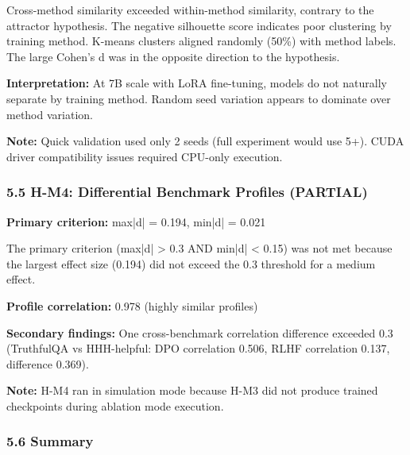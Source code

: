 Cross-method similarity exceeded within-method similarity, contrary to the attractor hypothesis. The negative silhouette score indicates poor clustering by training method. K-means clusters aligned randomly (50\%) with method labels. The large Cohen's d was in the opposite direction to the hypothesis.

\textbf{Interpretation:} At 7B scale with LoRA fine-tuning, models do not naturally separate by training method. Random seed variation appears to dominate over method variation.

\textbf{Note:} Quick validation used only 2 seeds (full experiment would use 5+). CUDA driver compatibility issues required CPU-only execution.

\subsubsection{5.5 H-M4: Differential Benchmark Profiles (PARTIAL)}

\begin{table}[htbp]
\centering
{}
\end{table}

\textbf{Primary criterion:} max|d| = 0.194, min|d| = 0.021

The primary criterion (max|d| > 0.3 AND min|d| < 0.15) was not met because the largest effect size (0.194) did not exceed the 0.3 threshold for a medium effect.

\textbf{Profile correlation:} 0.978 (highly similar profiles)

\textbf{Secondary findings:} One cross-benchmark correlation difference exceeded 0.3 (TruthfulQA vs HHH-helpful: DPO correlation 0.506, RLHF correlation 0.137, difference 0.369).

\textbf{Note:} H-M4 ran in simulation mode because H-M3 did not produce trained checkpoints during ablation mode execution.

\subsubsection{5.6 Summary}

